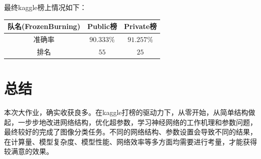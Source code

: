 \documentclass[UTF8]{ctexart}
\begin{document}
最终kaggle榜上情况如下：
\begin{table}[H]
    \centering
    \begin{tabular}{ccc}
        \hline
        队名(\textbf{FrozenBurning})&Public榜&\textbf{Private榜}\\
        \hline
        准确率 & $90.333\%$ &$91.257\%$\\
        排名 &$55$ &$25$\\
        \hline
    \end{tabular}
\end{table}

\section{总结}

本次大作业，确实收获良多。在kaggle打榜的驱动力下，从零开始，从简单结构做起，一步步地改进网络结构，优化超参数，学习神经网络的工作机理和参数问题，最终较好的完成了图像分类任务。不同的网络结构、参数设置会导致不同的结果，在计算量、模型复杂度、模型性能、网络效率等多方面均需要进行考量，才能获得较满意的效果。
\end{document}
